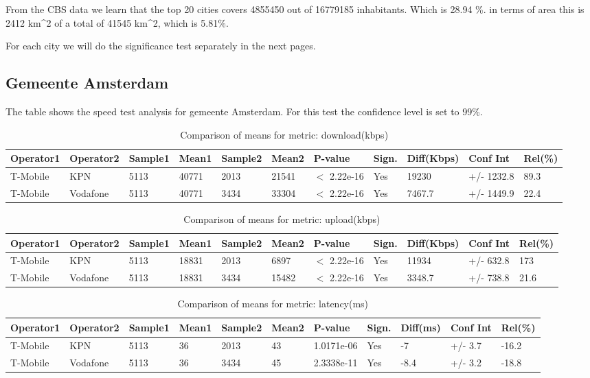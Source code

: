 \documentclass[]{article}
\begin{document}
From the CBS data we learn that the top 20 cities covers 4855450 out of
16779185 inhabitants. Which is 28.94 \%. in terms of area this is 2412
km\^{}2 of a total of 41545 km\^{}2, which is 5.81\%.

For each city we will do the significance test separately in the next
pages.
\newpage

\subsection{Gemeente Amsterdam}\label{gemeente-amsterdam}

The table shows the speed test analysis for gemeente Amsterdam. For this
test the confidence level is set to 99\%.

\begin{table}[ht]
\centering
{\footnotesize
\begin{tabular}{lllllllllll}
  \hline
Operator1 & Operator2 & Sample1 & Mean1 & Sample2 & Mean2 & P-value & Sign. & Diff(Kbps) & Conf Int & Rel(\%) \\ 
  \hline
T-Mobile & KPN & 5113 & 40771 & 2013 & 21541 & $<$ 2.22e-16 & Yes & 19230 & +/- 1232.8 & 89.3 \\ 
  T-Mobile & Vodafone & 5113 & 40771 & 3434 & 33304 & $<$ 2.22e-16 & Yes & 7467.7 & +/- 1449.9 & 22.4 \\ 
   \hline
\end{tabular}
}
\caption{Comparison of means for metric: download(kbps)} 
\end{table}

\begin{table}[ht]
\centering
{\footnotesize
\begin{tabular}{lllllllllll}
  \hline
Operator1 & Operator2 & Sample1 & Mean1 & Sample2 & Mean2 & P-value & Sign. & Diff(Kbps) & Conf Int & Rel(\%) \\ 
  \hline
T-Mobile & KPN & 5113 & 18831 & 2013 & 6897 & $<$ 2.22e-16 & Yes & 11934 & +/- 632.8 & 173 \\ 
  T-Mobile & Vodafone & 5113 & 18831 & 3434 & 15482 & $<$ 2.22e-16 & Yes & 3348.7 & +/- 738.8 & 21.6 \\ 
   \hline
\end{tabular}
}
\caption{Comparison of means for metric: upload(kbps)} 
\end{table}

\begin{table}[ht]
\centering
{\footnotesize
\begin{tabular}{lllllllllll}
  \hline
Operator1 & Operator2 & Sample1 & Mean1 & Sample2 & Mean2 & P-value & Sign. & Diff(ms) & Conf Int & Rel(\%) \\ 
  \hline
T-Mobile & KPN & 5113 & 36 & 2013 & 43 & 1.0171e-06 & Yes & -7 & +/- 3.7 & -16.2 \\ 
  T-Mobile & Vodafone & 5113 & 36 & 3434 & 45 & 2.3338e-11 & Yes & -8.4 & +/- 3.2 & -18.8 \\ 
   \hline
\end{tabular}
}
\caption{Comparison of means for metric: latency(ms)} 
\end{table}
\end{document}
